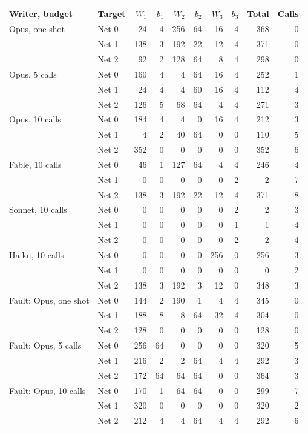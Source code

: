 \begin{tabular}{llrrrrrrrr}
\toprule
Writer, budget & Target & $W_1$ & $b_1$ & $W_2$ & $b_2$ & $W_3$ & $b_3$ & Total & Calls \\
\midrule
Opus, one shot & Net 0 & 24 & 4 & 256 & 64 & 16 & 4 & 368 & 0 \\
 & Net 1 & 138 & 3 & 192 & 22 & 12 & 4 & 371 & 0 \\
 & Net 2 & 92 & 2 & 128 & 64 & 8 & 4 & 298 & 0 \\
Opus, 5 calls & Net 0 & 160 & 4 & 4 & 64 & 16 & 4 & 252 & 1 \\
 & Net 1 & 24 & 4 & 4 & 60 & 16 & 4 & 112 & 4 \\
 & Net 2 & 126 & 5 & 68 & 64 & 4 & 4 & 271 & 3 \\
Opus, 10 calls & Net 0 & 184 & 4 & 4 & 0 & 16 & 4 & 212 & 3 \\
 & Net 1 & 4 & 2 & 40 & 64 & 0 & 0 & 110 & 5 \\
 & Net 2 & 352 & 0 & 0 & 0 & 0 & 0 & 352 & 6 \\
\midrule
Fable, 10 calls & Net 0 & 46 & 1 & 127 & 64 & 4 & 4 & 246 & 4 \\
 & Net 1 & 0 & 0 & 0 & 0 & 0 & 2 & 2 & 7 \\
 & Net 2 & 138 & 3 & 192 & 22 & 12 & 4 & 371 & 8 \\
Sonnet, 10 calls & Net 0 & 0 & 0 & 0 & 0 & 0 & 2 & 2 & 3 \\
 & Net 1 & 0 & 0 & 0 & 0 & 0 & 1 & 1 & 4 \\
 & Net 2 & 0 & 0 & 0 & 0 & 0 & 2 & 2 & 4 \\
Haiku, 10 calls & Net 0 & 0 & 0 & 0 & 0 & 256 & 0 & 256 & 3 \\
 & Net 1 & 0 & 0 & 0 & 0 & 0 & 0 & 0 & 2 \\
 & Net 2 & 138 & 3 & 192 & 3 & 12 & 0 & 348 & 3 \\
\midrule
Fault: Opus, one shot & Net 0 & 144 & 2 & 190 & 1 & 4 & 4 & 345 & 0 \\
 & Net 1 & 188 & 8 & 8 & 64 & 32 & 4 & 304 & 0 \\
 & Net 2 & 128 & 0 & 0 & 0 & 0 & 0 & 128 & 0 \\
Fault: Opus, 5 calls & Net 0 & 256 & 64 & 0 & 0 & 0 & 0 & 320 & 5 \\
 & Net 1 & 216 & 2 & 2 & 64 & 4 & 4 & 292 & 3 \\
 & Net 2 & 172 & 64 & 64 & 64 & 0 & 0 & 364 & 3 \\
Fault: Opus, 10 calls & Net 0 & 170 & 1 & 64 & 64 & 0 & 0 & 299 & 7 \\
 & Net 1 & 320 & 0 & 0 & 0 & 0 & 0 & 320 & 2 \\
 & Net 2 & 212 & 4 & 4 & 64 & 4 & 4 & 292 & 6 \\
\bottomrule
\end{tabular}
